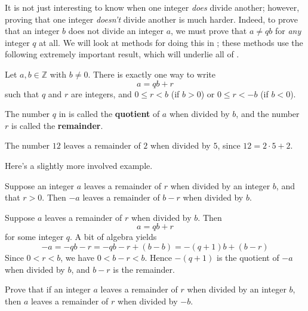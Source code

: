 It is not just interesting to know when one integer \textit{does} divide another; however, proving that one integer \textit{doesn't} divide another is much harder. Indeed, to prove that an integer $b$ does not divide an integer $a$, we must prove that $a \ne qb$ for \textit{any} integer $q$ at all. We will look at methods for doing this in ; these methods use the following extremely important result, which will underlie all of .

\begin{theorem}
\label{thmDivisionPreliminary}
Let $a,b \in \mathbb{Z}$ with $b \ne 0$. There is exactly one way to write
\[ a = qb + r \]
such that $q$ and $r$ are integers, and $0 \le r < b$ (if $b > 0$) or $0 \le r < -b$ (if $b < 0$).
\end{theorem}

The number $q$ in  is called the \textbf{quotient} of $a$ when divided by $b$, and the number $r$ is called the \textbf{remainder}.

\begin{example}
The number $12$ leaves a remainder of $2$ when divided by $5$, since $12 = 2 \cdot 5 + 2$.
\end{example}

Here's a slightly more involved example.

\begin{proposition}
Suppose an integer $a$ leaves a remainder of $r$ when divided by an integer $b$, and that $r>0$. Then $-a$ leaves a remainder of $b-r$ when divided by $b$.
\end{proposition}

\begin{cproof}
Suppose $a$ leaves a remainder of $r$ when divided by $b$. Then
\[ a=qb+r \]
for some integer $q$. A bit of algebra yields
\[ -a = -qb-r = -qb-r+(b-b) = -(q+1)b + (b-r) \]
Since $0<r<b$, we have $0<b-r<b$. Hence $-(q+1)$ is the quotient of $-a$ when divided by $b$, and $b-r$ is the remainder.
\end{cproof}

\begin{exercise}
Prove that if an integer $a$ leaves a remainder of $r$ when divided by an integer $b$, then $a$ leaves a remainder of $r$ when divided by $-b$.
\end{exercise}

